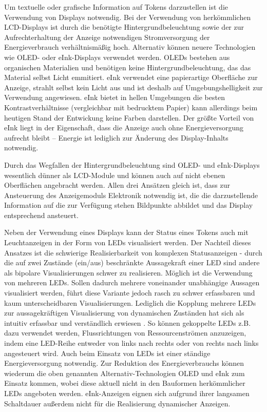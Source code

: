 Um textuelle oder grafische Information auf Tokens darzustellen ist die Verwendung von Displays notwendig. Bei der Verwendung von herkömmlichen \gls{LCD}-Displays ist durch die benötigte Hintergrundbeleuchtung sowie der zur Aufrechterhaltung der Anzeige notwendigen Stromversorgung der Energieverbrauch verhältnismäßig hoch. Alternativ können neuere Technologien wie \gls{OLED}- \citep{Shinar04} oder eInk-Displays \citep{Comiskey98} verwendet werden. \glspl{OLED} bestehen aus organischen Materialien und benötigen keine Hintergrundbeleuchtung, das das Material selbst Licht emmitiert. eInk verwendet eine papierartige Oberfläche zur Anzeige, strahlt selbst kein Licht aus und ist deshalb auf Umgebungshelligkeit zur Verwendung angewiesen. eInk bietet in hellen Umgebungen die besten Kontrastverhältnisse (vergleichbar mit bedrucktem Papier) kann allerdings beim heutigen Stand der Entwickung keine Farben darstellen. Der größte Vorteil von eInk liegt in der Eigenschaft, dass die Anzeige auch ohne Energieversorgung aufrecht bleibt -- Energie ist lediglich zur Änderung des Display-Inhalts notwendig.

Durch das Wegfallen der Hintergrundbeleuchtung sind \gls{OLED}- und eInk-Displays wesentlich dünner als \gls{LCD}-Module und können auch auf nicht ebenen Oberflächen angebracht werden. Allen drei Ansätzen gleich ist, dass zur Ansteuerung des Anzeigemoduls Elektronik notwendig ist, die die darzustellende Information auf die zur Verfügung stehen Bildpunkte abbildet und das Display entsprechend ansteuert.

Neben der Verwendung eines Displays kann der Status eines Tokens auch mit Leuchtanzeigen in der Form von \glspl{LED} visualisiert werden. Der Nachteil dieses Ansatzes ist die schwierige Realisierbarkeit von komplexen Statusanzeigen - durch die auf zwei Zustände (ein/aus) beschränkte Aussagekraft einer \gls{LED} sind andere als bipolare Visualisierungen schwer zu realisieren. Möglich ist die Verwendung von mehreren \glspl{LED}. Sollen dadurch mehrere voneinander unabhängige Aussagen visualisiert werden, führt diese Variante jedoch rasch zu schwer erfassbaren und kaum unterscheidbaren Visualisierungen. Lediglich die Kopplung mehrere \glspl{LED} zur aussagekräftigen Visualisierung von dynamischen Zuständen hat sich als intuitiv erfassbar und verständlich erwiesen \citep{Zuckerman05}. So können gekoppelte \glspl{LED} z.B. dazu verwendet werden, Flussrichtungen von Ressourcenströmen anzuzeigen, indem eine \gls{LED}-Reihe entweder von links nach rechts oder von rechts nach links angesteuert wird. Auch beim Einsatz von \glspl{LED} ist einer ständige Energieversorgung notwendig. Zur Reduktion des Energieverbrauchs können wiederum die oben genannten Alternativ-Technologien \gls{OLED} und eInk zum Einsatz kommen, wobei diese aktuell nicht in den Bauformen herkömmlicher \glspl{LED} angeboten werden. eInk-Anzeigen eignen sich aufgrund ihrer langsamen Schaltdauer außerdem nicht für die Realisierung dynamischer Anzeigen.


